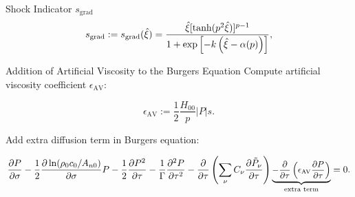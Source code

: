 \documentclass{beamer}
\newcounter{sectionframecount}
\begin{document}

\begin{frame}[t]{Shock Indicator $s_{\text{grad}}$}
  \vspace{-10pt}
  \begin{equation}
    \small
    s_\text{grad} := s_\text{grad}(\hat{\xi}) = \dfrac{\hat{\xi} [\tanh(p^2\hat{\xi})]^{p-1}}{1+\exp\left[-k \left(\hat{\xi} - \alpha(p)\right)\right]},
    \label{e:s_grad}
  \end{equation}

  \end{frame}



\begin{frame}[t]{Addition of Artificial Viscosity to the Burgers Equation}
Compute artificial viscosity coefficient $\epsilon_{\text{AV}}$:

\begin{equation}
  \epsilon_{\text{AV}} := \dfrac{1}{2}\dfrac{H_{00}}{p}|P|s.
\end{equation}

Add extra diffusion term in Burgers equation:

\begin{equation}
  \small
  \dfrac{\partial P}{\partial \sigma}
  -\dfrac{1}{2}\dfrac{\partial \ln(\rho_0c_0/A_{n0})}{\partial \sigma}P
  -\dfrac{1}{2}\dfrac{\partial P^2}{\partial \tau}
  -\dfrac{1}{\Gamma}\dfrac{\partial ^2 P}{\partial \tau^2}
  -\dfrac{\partial }{\partial \tau}\left(\sum_{\nu} C_\nu \dfrac{\partial\tilde{P}_\nu}{\partial \tau}\right)
  \underbrace{- \dfrac{\partial}{\partial \tau} \left(\epsilon_{\text{AV}}\dfrac{\partial P}{\partial \tau}\right)}_{\text{extra term}}
  =0.
\end{equation}

\end{frame}
\end{document}
